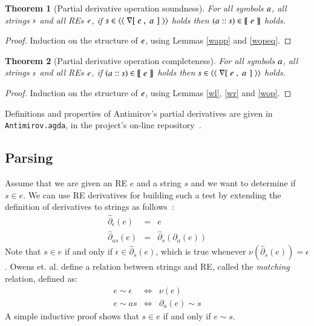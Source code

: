 \documentclass[review]{elsarticle}
\newtheorem{Theorem}{Theorem}
\theoremstyle{definition}
\newcommand{\D}[1]{\blue{\mathsf{#1}}}
\newcommand{\C}[1]{\red{\mathsf{#1}}}
\newcommand{\F}[1]{\green{\mathsf{#1}}}
\newcommand{\V}[1]{\purple{\mathit{#1}}}
\begin{document}
\begin{Theorem}[Partial derivative operation soundness]
For all symbols \ensuremath{\V{a}}, all strings \ensuremath{\V{s}} and all REs \ensuremath{\V{e}}, if \ensuremath{\V{s}\;\D{\in\langle\langle}\;\F{\nabla[}\;\V{e}\;\red{,}\,\;\V{a}\;\mskip1.5mu]\;\D{\rangle\rangle}} holds then \ensuremath{(\V{a}\;\C{::}\;\V{s})\;\D{\in\llbracket}\;\V{e}\;\D{\rrbracket}} holds.
\end{Theorem}
\begin{proof}
  Induction on the structure of \ensuremath{\V{e}}, using Lemmas \ref{wapp} and \ref{wopeq}.
\end{proof}

\begin{Theorem}[Partial derivative operation completeness]
For all symbols \ensuremath{\V{a}}, all strings \ensuremath{\V{s}} and all REs \ensuremath{\V{e}}, if \ensuremath{(\V{a}\;\C{::}\;\V{s})\;\D{\in\llbracket}\;\V{e}\;\D{\rrbracket}} holds then \ensuremath{\V{s}\;\D{\in\langle\langle}\;\F{\nabla[}\;\V{e}\;\red{,}\,\;\V{a}\;\mskip1.5mu]\;\D{\rangle\rangle}} holds.
\end{Theorem}
\begin{proof}
  Induction on the structure  of \ensuremath{\V{e}}, using Lemmas \ref{wl}, \ref{wr} and \ref{wop}.
\end{proof}

Definitions and properties of Antimirov's partial derivatives are given in
\texttt{Antimirov.agda}, in the project's on-line
repository~\cite{regex-rep}.

\subsection{Parsing}

Assume that we are given an RE $e$ and a string $s$ and we want to 
determine if $s \in e$. We can use RE derivatives for building such a 
test by extending the definition of derivatives to strings as follows~\cite{Owens2009}:
\[
    \begin{array}{lcl}
        \widehat{\partial}_\epsilon(e) & = & e\\
        \widehat{\partial}_{as}(e)     & = & \widehat{\partial}_s(\partial_a(e))
    \end{array}
\]
Note that $s \in e$ if and only if $\epsilon \in \widehat{\partial}_s(e)$, which is true whenever 
$\nu(\widehat{\partial}_s(e)) = \epsilon$. Owens et. al. define a relation between strings and RE, called
the \emph{matching} relation, defined as:
\[
    \begin{array}{lcl}
        e \sim \epsilon & \Leftrightarrow & \nu(e) \\
        e \sim as       & \Leftrightarrow & \partial_a(e) \sim s
    \end{array}
\] 
A simple inductive proof shows that $s \in e$ if and only if $e \sim s$. 
\end{document}
